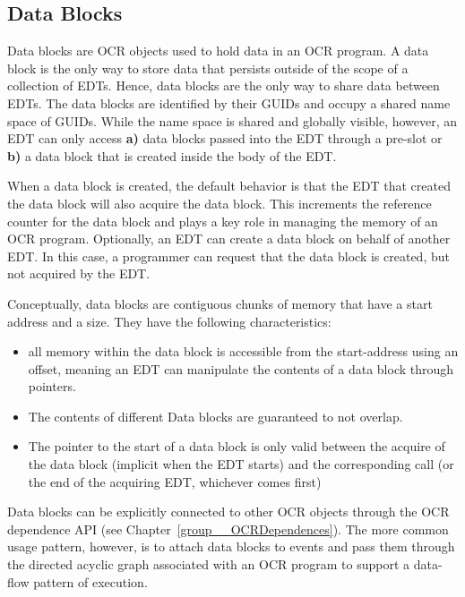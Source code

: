 \subsection{Data Blocks}
\label{sec:datablocks}
Data blocks are OCR objects used to hold data in an OCR program. A
data block is the only way to store data that persists outside of the
scope of a collection of EDTs. Hence, data blocks are the only way to
share data between EDTs. The data blocks are identified by their
GUIDs and occupy a shared name space of GUIDs. While the name space
is shared and globally visible, however, an EDT can only access {\bf a)}
data blocks passed into the EDT through a pre-slot or {\bf b)} a data block
that is created inside the body of the EDT.

When a data block is created, the default behavior is that the EDT
that created the data block will also acquire the data block. This
increments the reference counter for the data block and plays a key
role in managing the memory of an OCR program. Optionally, an EDT can
create a data block on behalf of another EDT. In this case, a
programmer can request that the data block is created, but not
acquired by the EDT.

Conceptually, data blocks are contiguous chunks of memory
that have a start address and a size. They have the following characteristics:
\begin{itemize}
\item all memory within the data block is accessible from the
start-address using an offset, meaning an EDT can manipulate the
contents of a data block through pointers.
\item The contents of different Data blocks are guaranteed to not
overlap.
\item The pointer to the start of a data block is only valid between
the acquire of the data block (implicit when the EDT starts) and the
corresponding  call (or the end of the acquiring
EDT, whichever comes first)
\end{itemize}

Data blocks can be explicitly connected to other OCR objects through the OCR
dependence API (see Chapter~\ref{group__OCRDependences}).
The more common usage pattern, however, is
to attach data blocks to events and pass them through the
directed acyclic graph associated with an OCR program to support a
data-flow pattern of execution.

